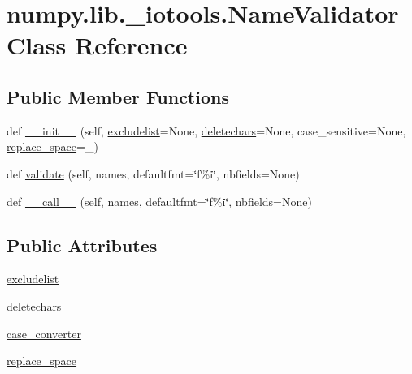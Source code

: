 \hypertarget{classnumpy_1_1lib_1_1__iotools_1_1NameValidator}{}\section{numpy.\+lib.\+\_\+iotools.\+Name\+Validator Class Reference}
\label{classnumpy_1_1lib_1_1__iotools_1_1NameValidator}
\subsection*{Public Member Functions}
\begin{DoxyCompactItemize}
\item 
def \hyperlink{classnumpy_1_1lib_1_1__iotools_1_1NameValidator_af2fea61d528aa285cd2c3a975c43dbc1}{\+\_\+\+\_\+init\+\_\+\+\_\+} (self, \hyperlink{classnumpy_1_1lib_1_1__iotools_1_1NameValidator_ad240b448f3804b44b247d506d56c7a30}{excludelist}=None, \hyperlink{classnumpy_1_1lib_1_1__iotools_1_1NameValidator_a60c4685bb3479da696d680c322de1c26}{deletechars}=None, case\+\_\+sensitive=None, \hyperlink{classnumpy_1_1lib_1_1__iotools_1_1NameValidator_a6b2416d12020f22e325e8e001ba314ca}{replace\+\_\+space}=\textquotesingle{}\+\_\+\textquotesingle{})
\item 
def \hyperlink{classnumpy_1_1lib_1_1__iotools_1_1NameValidator_a4c6df4cd621243673cfc0d48569ff4c5}{validate} (self, names, defaultfmt=\char`\"{}f\%i\char`\"{}, nbfields=None)
\item 
def \hyperlink{classnumpy_1_1lib_1_1__iotools_1_1NameValidator_a4305cc5d683dfeb520c1e933c78878ae}{\+\_\+\+\_\+call\+\_\+\+\_\+} (self, names, defaultfmt=\char`\"{}f\%i\char`\"{}, nbfields=None)
\end{DoxyCompactItemize}
\subsection*{Public Attributes}
\begin{DoxyCompactItemize}
\item 
\hyperlink{classnumpy_1_1lib_1_1__iotools_1_1NameValidator_ad240b448f3804b44b247d506d56c7a30}{excludelist}
\item 
\hyperlink{classnumpy_1_1lib_1_1__iotools_1_1NameValidator_a60c4685bb3479da696d680c322de1c26}{deletechars}
\item 
\hyperlink{classnumpy_1_1lib_1_1__iotools_1_1NameValidator_a2681b70582c336b3a67095923bac684d}{case\+\_\+converter}
\item 
\hyperlink{classnumpy_1_1lib_1_1__iotools_1_1NameValidator_a6b2416d12020f22e325e8e001ba314ca}{replace\+\_\+space}
\end{DoxyCompactItemize}
